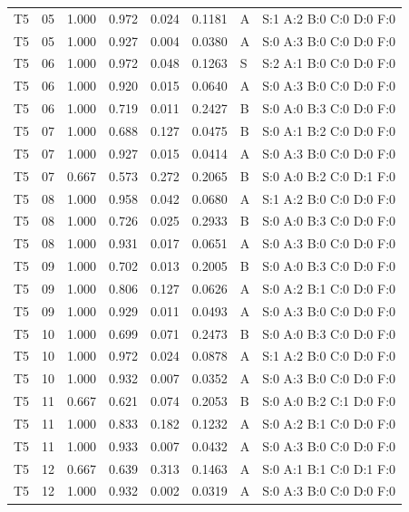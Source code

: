 \begin{longtable}{lrrrrrll}
T5 & 05 & 1.000 & 0.972 & 0.024 & 0.1181 & A & \tiny S:1 A:2 B:0 C:0 D:0 F:0 \\
T5 & 05 & 1.000 & 0.927 & 0.004 & 0.0380 & A & \tiny S:0 A:3 B:0 C:0 D:0 F:0 \\
T5 & 06 & 1.000 & 0.972 & 0.048 & 0.1263 & S & \tiny S:2 A:1 B:0 C:0 D:0 F:0 \\
T5 & 06 & 1.000 & 0.920 & 0.015 & 0.0640 & A & \tiny S:0 A:3 B:0 C:0 D:0 F:0 \\
T5 & 06 & 1.000 & 0.719 & 0.011 & 0.2427 & B & \tiny S:0 A:0 B:3 C:0 D:0 F:0 \\
T5 & 07 & 1.000 & 0.688 & 0.127 & 0.0475 & B & \tiny S:0 A:1 B:2 C:0 D:0 F:0 \\
T5 & 07 & 1.000 & 0.927 & 0.015 & 0.0414 & A & \tiny S:0 A:3 B:0 C:0 D:0 F:0 \\
T5 & 07 & 0.667 & 0.573 & 0.272 & 0.2065 & B & \tiny S:0 A:0 B:2 C:0 D:1 F:0 \\
T5 & 08 & 1.000 & 0.958 & 0.042 & 0.0680 & A & \tiny S:1 A:2 B:0 C:0 D:0 F:0 \\
T5 & 08 & 1.000 & 0.726 & 0.025 & 0.2933 & B & \tiny S:0 A:0 B:3 C:0 D:0 F:0 \\
T5 & 08 & 1.000 & 0.931 & 0.017 & 0.0651 & A & \tiny S:0 A:3 B:0 C:0 D:0 F:0 \\
T5 & 09 & 1.000 & 0.702 & 0.013 & 0.2005 & B & \tiny S:0 A:0 B:3 C:0 D:0 F:0 \\
T5 & 09 & 1.000 & 0.806 & 0.127 & 0.0626 & A & \tiny S:0 A:2 B:1 C:0 D:0 F:0 \\
T5 & 09 & 1.000 & 0.929 & 0.011 & 0.0493 & A & \tiny S:0 A:3 B:0 C:0 D:0 F:0 \\
T5 & 10 & 1.000 & 0.699 & 0.071 & 0.2473 & B & \tiny S:0 A:0 B:3 C:0 D:0 F:0 \\
T5 & 10 & 1.000 & 0.972 & 0.024 & 0.0878 & A & \tiny S:1 A:2 B:0 C:0 D:0 F:0 \\
T5 & 10 & 1.000 & 0.932 & 0.007 & 0.0352 & A & \tiny S:0 A:3 B:0 C:0 D:0 F:0 \\
T5 & 11 & 0.667 & 0.621 & 0.074 & 0.2053 & B & \tiny S:0 A:0 B:2 C:1 D:0 F:0 \\
T5 & 11 & 1.000 & 0.833 & 0.182 & 0.1232 & A & \tiny S:0 A:2 B:1 C:0 D:0 F:0 \\
T5 & 11 & 1.000 & 0.933 & 0.007 & 0.0432 & A & \tiny S:0 A:3 B:0 C:0 D:0 F:0 \\
T5 & 12 & 0.667 & 0.639 & 0.313 & 0.1463 & A & \tiny S:0 A:1 B:1 C:0 D:1 F:0 \\
T5 & 12 & 1.000 & 0.932 & 0.002 & 0.0319 & A & \tiny S:0 A:3 B:0 C:0 D:0 F:0 \\

\end{longtable}
